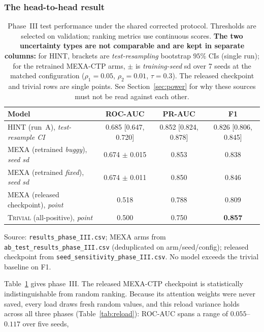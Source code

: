 \documentclass[a4paper,fleqn]{cas-sc}
\begin{document}
\subsubsection{The head-to-head result}
\begin{table}[t]
\centering
\small
\caption{Phase~III test performance under the shared corrected protocol. Thresholds are selected on validation; ranking metrics use continuous scores. \textbf{The two uncertainty types are not comparable and are kept in separate columns:} for HINT, brackets are \emph{test-resampling} bootstrap $95\%$ CIs (single run); for the retrained MEXA-CTP arms, $\pm$ is \emph{training-seed} sd over 7 seeds at the matched configuration ($\rho_1{=}0.05$, $\rho_2{=}0.01$, $\tau{=}0.3$). The released checkpoint and trivial rows are single points. See Section~\ref{sec:power} for why these sources must not be read against each other.}
\label{tab:fair}
\begin{tabular}{lccc}
\toprule
Model & ROC-AUC & PR-AUC & F1 \\
\midrule
HINT (run~A), \emph{test-resample CI} & 0.685 {\scriptsize [0.647, 0.720]} & 0.852 {\scriptsize [0.824, 0.878]} & 0.826 {\scriptsize [0.806, 0.845]} \\
MEXA (retrained \emph{buggy}), \emph{seed sd} & 0.674 $\pm$ 0.015 & 0.853 & 0.838 \\
MEXA (retrained \emph{fixed}), \emph{seed sd} & 0.674 $\pm$ 0.011 & 0.850 & 0.846 \\
MEXA (released checkpoint), \emph{point} & 0.518 & 0.788 & 0.809 \\
\textsc{Trivial} (all-positive), \emph{point} & 0.500 & 0.750 & \textbf{0.857} \\
\bottomrule
\end{tabular}
\begin{minipage}{\linewidth}\vspace{2pt}\scriptsize Source: \texttt{results\_phase\_III.csv}; MEXA arms from \texttt{ab\_test\_results\_phase\_III.csv} (deduplicated on arm/seed/config); released checkpoint from \texttt{seed\_sensitivity\_phase\_III.csv}. No model exceeds the trivial baseline on F1. \end{minipage}
\end{table}
Table~\ref{tab:fair} gives phase~III. The released MEXA-CTP checkpoint is statistically
indistinguishable from random ranking. Because its attention weights were never saved,
every load draws fresh random values, and this reload variance holds across all three
phases (Table~\ref{tab:reload}): ROC-AUC spans a range of $0.055$--$0.117$ over five seeds,
\end{document}
